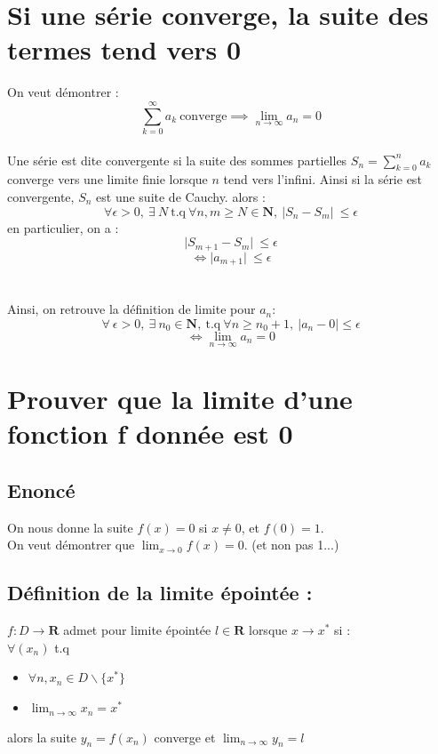 \documentclass{article}
\begin{document}
\newpage

\section{Si une série converge, la suite des termes tend vers 0}

On veut démontrer :
\[ \sum_{k=0}^{\infty} a_k\ \text{converge} \implies \lim_{n\to\infty} a_n = 0 \]\\
Une série est dite convergente si la suite des sommes partielles $S_n = \sum_{k=0}^{n} a_k$ converge vers une limite finie lorsque $n$ tend vers l'infini. Ainsi si la série est convergente, $ S_n $ est une suite de Cauchy.
alors :
\[ \forall \epsilon > 0,\ \exists\ N\ \text{t.q}\ \forall n, m \geq N \in \mathbf{N},\ \lvert S_n - S_m \lvert\ \leq \epsilon \]
en particulier, on a :
\[ \lvert S_{m+1} - S_m \lvert\ \leq \epsilon \]
\[ \Leftrightarrow \lvert a_{m+1} \lvert\ \leq \epsilon \]\\\\
Ainsi, on retrouve la définition de limite pour $ a_n $:\\
\[ \forall\ \epsilon > 0,\ \exists\ n_0 \in \mathbf{N},\ \text{t.q}\ \forall n \geq n_0 + 1,\ |a_n - 0| \leq \epsilon \]
\[ \Leftrightarrow \lim_{n\to\infty} a_n = 0 \]

\newpage

\section{Prouver que la limite d'une fonction f donnée est 0}

\subsection{Enoncé}
On nous donne la suite $ f(x) = 0 $ si $ x \neq 0 $, et $ f(0) = 1 $.\\
On veut démontrer que $ \lim_{x\to{0}} f(x) = 0 $. (et non pas 1...)
\subsection{Définition de la limite épointée :}
$ f : D \to \mathbf{R} $ admet pour limite épointée $ l \in \mathbf{R} $ lorsque $ x \to x^* $ si :\\
$ \forall (x_n) $ t.q
\begin{itemize}
    \item $\forall n, x_n \in D \backslash \{x^*\} $
    \item $ \lim_{n\to\infty} x_n = x^*$
\end{itemize}
alors la suite $ y_n = f(x_n) $ converge et $ \lim_{n\to\infty} y_n = l$
\end{document}
